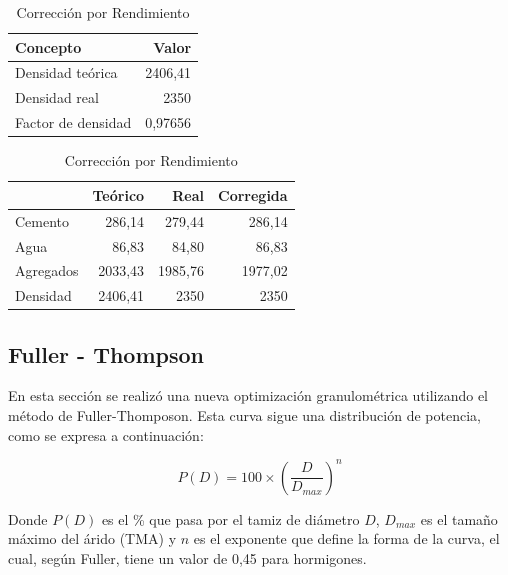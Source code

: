 \begin{table}[H]
\centering
\caption{Rendimiento de mezcla y factor de densidad}
\label{tab:rend-y-factor}
\small
\setlength{\tabcolsep}{6pt}
\renewcommand{\arraystretch}{1.15}

\begin{subtable}[t]{0.38\textwidth}
\centering
\caption{Densidades}
\label{tab:factor-rendimiento}
\begin{tabular}{lr}
\toprule
\textbf{Concepto} & \textbf{Valor} \\
\midrule
Densidad teórica & 2406,41 \\
Densidad real    & 2350 \\
Factor de densidad          & 0,97656 \\
\bottomrule
\end{tabular}
\end{subtable}
\begin{subtable}[t]{0.58\textwidth}
\centering
\caption{Corrección por Rendimiento}
\label{tab:rendimiento}
\begin{tabular}{lrrr}
\toprule
 & \textbf{Teórico} & \textbf{Real} & \textbf{Corregida} \\
\midrule
Cemento   & 286,14 & 279,44 & 286,14 \\
Agua      & 86,83 & 84,80 & 86,83 \\
Agregados & 2033,43 & 1985,76 & 1977,02 \\
Densidad  & 2406,41 & 2350 & 2350 \\
\bottomrule
\end{tabular}
\end{subtable}

\end{table}


\subsection{Fuller - Thompson}

En esta sección se realizó una nueva optimización granulométrica utilizando el método de Fuller-Thomposon. Esta curva sigue una distribución de potencia, como se expresa a continuación:

\begin{equation}
    P(D) = 100 \times (\frac{D}{D_{max}})^n
\end{equation}

Donde $P(D)$ es el \% que pasa por el tamiz de diámetro $D$, $D_{max}$ es el tamaño máximo del árido (TMA) y $n$ es el exponente que define la forma de la curva, el cual, según Fuller, tiene un valor de 0,45 para hormigones.

